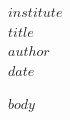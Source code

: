\documentclass[12pt,a4paper]{article}
\begin{document}
\begin{titlepage}
    \begin{center}
        {\large $institute$}\\[4cm]
        {\bfseries\large $title$}\\[4cm]
        {\large $author$}\\[4cm]
        {\large $date$}
    \end{center}
\end{titlepage}

\tableofcontents
\newpage

$body$
\end{document}
